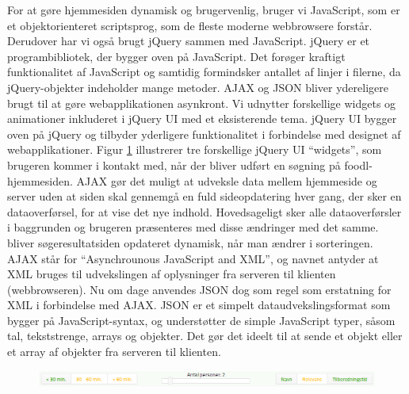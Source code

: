 For at gøre hjemmesiden dynamisk og brugervenlig, bruger vi JavaScript\cite{javascriptwiki}, som er et objektorienteret scriptsprog, som de fleste moderne webbrowsere forstår. Derudover har vi også brugt jQuery\cite{jquery} sammen med JavaScript. jQuery er et programbibliotek, der bygger oven på JavaScript. Det forøger kraftigt funktionalitet af JavaScript og samtidig formindsker antallet af linjer i filerne, da jQuery-objekter indeholder mange metoder. AJAX\cite{ajaxwiki} og JSON\cite{jsonwiki} bliver ydereligere brugt til at gøre webapplikationen asynkront. Vi udnytter forskellige widgets og animationer inkluderet i jQuery UI\cite{jqueryuiwiki} med et eksisterende tema. jQuery UI bygger oven på jQuery og tilbyder yderligere funktionalitet i forbindelse med designet af webapplikationer. Figur \ref{fig:toolbar} illustrerer tre forskellige jQuery UI ``widgets'', som brugeren kommer i kontakt med, når der bliver udført en søgning på foodl-hjemmesiden. AJAX gør det muligt at udveksle data mellem hjemmeside og server uden at siden skal gennemgå en fuld sideopdatering hver gang, der sker en dataoverførsel, for at vise det nye indhold. Hovedsageligt sker alle dataoverførsler i baggrunden og brugeren præsenteres med disse ændringer med det samme. \Fx bliver søgeresultatsiden opdateret dynamisk, når man ændrer i sorteringen. AJAX står for ``Asynchrounous JavaScript and XML'', og navnet antyder at XML bruges til udvekslingen af oplysninger fra serveren til klienten (webbrowseren). Nu om dage anvendes JSON dog som regel som erstatning for XML i forbindelse med AJAX. JSON er et simpelt dataudvekslingsformat som bygger på JavaScript-syntax, og understøtter de simple JavaScript typer, såsom tal, tekststrenge, arrays og objekter. Det gør det ideelt til \fx at sende et objekt eller et array af objekter fra serveren til klienten.

\begin{figure}[H]
\centering
\includegraphics[scale=0.6]{billeder/jqueryuieksempel.png}
\label{fig:toolbar}
\end{figure}

